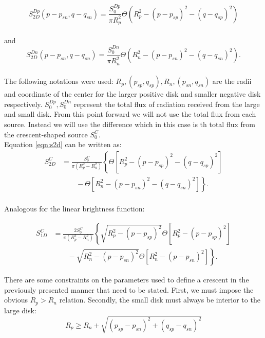 \documentclass[usenatbib]{mn2e}
\begin{document}
\begin{equation}
 S_{2D}^{Dp}(p-p_{sn}, q-q_{sn}) = \frac{S_0^{Dp}}{\pi R_p^2} \Theta \left( R_p^2 - \left( p-p_{sp} \right)^2 - \left( q-q_{sp} \right)^2 \right)
\end{equation}
\\
and
\begin{equation}
 S_{2D}^{Dn}(p-p_{sn}, q-q_{sn}) = \frac{S_0^{Dn}}{\pi R_n^2} \Theta \left( R_n^2 - \left( p-p_{sn} \right)^2 - \left( q-q_{sn} \right)^2 \right).
\end{equation}
\\
The following notations were used: $R_p, (p_{sp}, q_{sp}), R_n, (p_{sn},q_{sn})$ are the radii and coordinate of the center for the larger positive disk and smaller negative disk respectively.  $S_0^{Dp},S_0^{Dn}$ represent the total flux of radiation received from the large and small disk. From this point forward we will not use the total flux from each source. Instead we will 
use the difference which in this case is th total flux from the crescent-shaped source $S_0^C$. \\
Equation \ref{eqn:s2d} can be written as:\\

\begin{align}
 S_{2D}^C &= \frac{S_0^C}{\pi \left(R_p^2-R_n^2 \right)} \left\{ \Theta \left[ R_p^2 - \left( p-p_{sp} \right)^2 - \left( q-q_{sp} \right)^2 \right] \right.\nonumber\\
 &\qquad \left. {} -  \Theta \left[ R_n^2 - \left( p-p_{sn} \right)^2 - \left( q-q_{sn} \right)^2 \right] \right\}.
\end{align}
\\
Analogous for the linear brightness function:

\begin{align}
 S_{1D}^C &= \frac{2 S_0^C}{\pi \left(R_p^2-R_n^2 \right)} \left\{ \sqrt{R_p^2 - (p-p_{sp})^2}  \Theta \left[ R_p^2 - \left( p-p_{sp} \right)^2 \right] \right.\nonumber\\
 &\qquad \left. {} - \sqrt{R_n^2 - (p-p_{sn})^2 } \Theta \left[ R_n^2 - \left( p-p_{sn} \right)^2 \right] \right\}.
\label{eqn:s1_d}
\end{align}


There are some constraints on the parameters used to define a crescent in the previously presented manner that need to be stated. First, we must impose the obvious $R_p > R_n$ relation. Secondly, 
the small disk must always be interior to the large disk:
\begin{equation}
 R_p \ge R_n + \sqrt{\left(p_{sp} - p_{sn} \right)^2 + \left(q_{sp} - q_{sn} \right)^2}
\end{equation}
\end{document}
